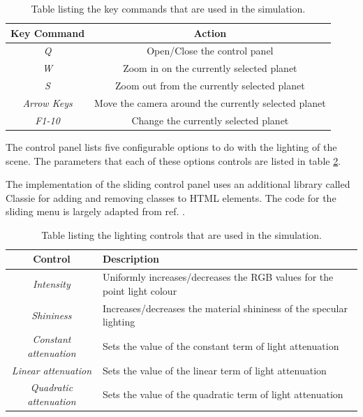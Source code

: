 \documentclass[conference]{IEEEtran}
\begin{document}
\begin{table}[!t]
\renewcommand{\arraystretch}{1.3}
\caption{Table listing the key commands that are used in the simulation.}
\label{table:keyboard-controls}
\centering
\begin{tabular}{|c|c|}
\hline
Key Command & Action \\ 
\hline
\textit{Q} & Open/Close the control panel \\ 
\hline
\textit{W} & Zoom in on the currently selected planet \\ 
\hline
\textit{S} & Zoom out from the currently selected planet \\ 
\hline
\textit{Arrow Keys} & Move the camera around the currently selected planet \\ 
\hline
\textit{F1-10} & Change the currently selected planet \\ 
\hline
\end{tabular}
\end{table}

The control panel lists five configurable options to do with the lighting of the scene. The parameters that each of these options controls are listed in table \ref{table:lighting-controls}.

The implementation of the sliding control panel uses an additional library called Classie \cite{classie} for adding and removing classes to HTML elements. The code for the sliding menu is largely adapted from ref. \cite{slidingmenu}. 

\begin{table}[!t]
\renewcommand{\arraystretch}{1.3}
\caption{Table listing the lighting controls that are used in the simulation.}
\label{table:lighting-controls}
\centering
\begin{tabular}{|c|p{5cm}|}
\hline
Control & Description \\ 
\hline
\textit{Intensity} & Uniformly increases/decreases the RGB values for the point light colour \\ 
\hline
\textit{Shininess} & Increases/decreases the material shininess of the specular lighting\\ 
\hline
\textit{Constant attenuation} & Sets the value of the constant term of light attenuation \\ 
\hline
\textit{Linear attenuation} & Sets the value of the linear term of light attenuation \\ 
\hline
\textit{Quadratic attenuation} & Sets the value of the quadratic term of light attenuation \\ 
\hline
\end{tabular}
\end{table}
\end{document}
